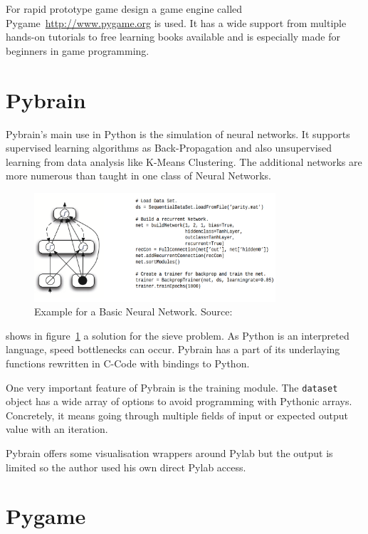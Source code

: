 \documentclass[bibtotocnumbered, headsepline,normalheadings,12pt]{report}
\begin{document}
For rapid prototype game design a game engine called Pygame~\url{http://www.pygame.org} is used. It has a wide support from multiple 
hands-on tutorials to free learning books available and is especially made for beginners in game programming.

\section{Pybrain}

Pybrain's main use in Python is the simulation of neural networks. It supports supervised learning algorithms as Back-Propagation
and also unsupervised learning from data analysis like K-Means Clustering. The additional networks are more numerous than 
taught in one class of Neural Networks. 

\begin{figure}[H]
    \centering
    \includegraphics[width=0.8\textwidth]{nnet.png}%
    \caption{Example for a Basic Neural Network. Source: \cite{pybrain2010jmlr}}
    \label{fig:nnet}%
\end{figure}

\cite{pybrain2010jmlr} shows in figure~\ref{fig:nnet} a solution for the sieve problem. As Python is an interpreted language, 
speed bottlenecks can occur. Pybrain has a part of its underlaying functions rewritten in C-Code with bindings to Python.

One very important feature of Pybrain is the training module. The \texttt{dataset} object has a wide array of options to avoid programming
with Pythonic arrays. Concretely, it means going through multiple fields of input or expected output value with an iteration. 

Pybrain offers some visualisation wrappers around Pylab but the output is limited so the author used his own direct Pylab access.

\section{Pygame}
\end{document}
